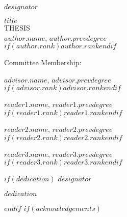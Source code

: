 \documentclass[12pt,letterpaper,toc=flat,oneside]{report}
\begin{document}
	\thispagestyle{empty}
	\setcounter{page}{3}
	\noindent $designator$
	\vfill
	\begin{center}
	    \MakeUppercase{$title$}\\[10pt]
	    \MakeUppercase{thesis}\\[10pt]
	    
	    \begingroup
  \singlespace
    $author.name$, $author.prevdegree$\\ 
    $if(author.rank)$$author.rank$$endif$
    \par
  \endgroup
  
	\bigskip\medskip
	Committee Membership:
	\bigskip\medskip
	
	\begingroup
  \singlespace
    $advisor.name$, $advisor.prevdegree$\\ 
    $if(advisor.rank)$$advisor.rank$$endif$
    \par
  \endgroup
  \bigskip\bigskip
  
  \begingroup
  \singlespace
    $reader1.name$, $reader1.prevdegree$\\ 
    $if(reader1.rank)$$reader1.rank$$endif$
    \par
  \endgroup
  \bigskip\bigskip
  
  \begingroup
  \singlespace
    $reader2.name$, $reader2.prevdegree$\\ 
    $if(reader2.rank)$$reader2.rank$$endif$
    \par
  \endgroup
  \bigskip\bigskip
  
  \begingroup
  \singlespace
    $reader3.name$, $reader3.prevdegree$\\ 
    $if(reader3.rank)$$reader3.rank$$endif$
    \par
  \endgroup
	\end{center}
	\vfill
	\newpage
$if(dedication)$
       \noindent 
       $designator$
       \vfill
       \begin{center}
	   \em{$dedication$}
	   \end{center}
	   \vfill
      \newpage
$endif$
$if(acknowledgements)$
\newenvironment{acknowledgements}{\ackhead}{\acktail}
\newenvironment{acknowledgments}{\ackhead}{\acktail}
\end{document}

